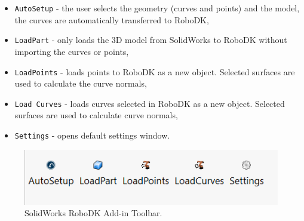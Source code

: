 \begin{itemize}
    \item \texttt{AutoSetup} - the user selects the geometry (curves and points) and the model, the curves are automatically transferred to RoboDK,
    \item \texttt{LoadPart} - only loads the 3D model from SolidWorks to RoboDK without importing the curves or points,
    \item \texttt{LoadPoints} - loads points to RoboDK as a new object. Selected surfaces are used to calculate the curve normals, 
    \item \texttt{Load Curves} -  loads curves selected in RoboDK as a new object. Selected surfaces are used to calculate curve normals, 
    \item \texttt{Settings} - opens default settings window.
\end{itemize}

\begin{figure}[h]
    \centering
    \includegraphics[width=0.6\linewidth]{img/solidworks_toolbar.PNG}
    \caption{SolidWorks RoboDK Add-in Toolbar.}
    \label{fig:solidworkstoolbar}
\end{figure}



